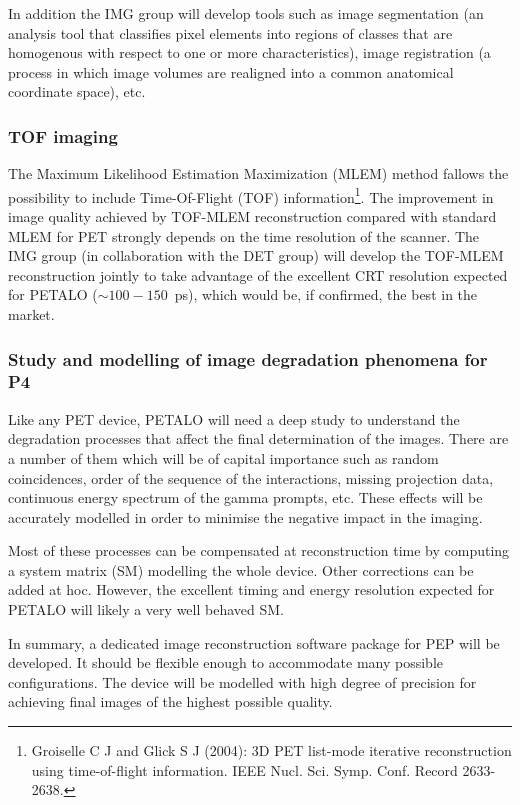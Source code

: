 In addition the IMG group will develop tools such as image segmentation (an analysis tool that classifies pixel elements into regions of classes that are homogenous with respect to one or more characteristics), image registration (a process in which image volumes are realigned into a common anatomical coordinate space), etc. 

\subsubsection*{TOF imaging}

The Maximum Likelihood Estimation Maximization
(MLEM) method fallows the possibility to include
Time-Of-Flight (TOF) information\footnote{Groiselle C J and Glick S J (2004): 3D PET list-mode iterative reconstruction using time-of-flight
information. IEEE Nucl. Sci. Symp. Conf. Record 2633-2638.}. The improvement in image quality achieved by TOF-MLEM reconstruction compared with standard MLEM for PET strongly depends
on the time resolution of the scanner. The IMG group (in collaboration with the DET group) will develop the TOF-MLEM reconstruction jointly to take advantage of the excellent CRT resolution expected for PETALO ($\sim 100-150$~ps), which would be, if confirmed, the best in the market. 

\subsubsection*{Study and modelling of image degradation phenomena for P4}

Like any PET device, PETALO will need a deep study to understand the  
degradation processes that affect the final determination of the images. There are a number of them which will be of capital importance such as random coincidences, order of the sequence of the interactions, missing projection data, continuous energy spectrum of the gamma prompts, etc. These effects will be accurately modelled in order to minimise the negative impact in the imaging.

Most of these processes can be compensated at reconstruction time by computing a system matrix (SM) modelling the whole device. Other corrections can be added at hoc. However, the excellent timing and energy resolution expected for PETALO will likely a very well behaved SM. 

In summary, a dedicated image reconstruction software package for PEP will be developed. It should be flexible enough to accommodate many possible configurations. The device will be modelled with high degree of precision for achieving final images of the highest possible quality. 

